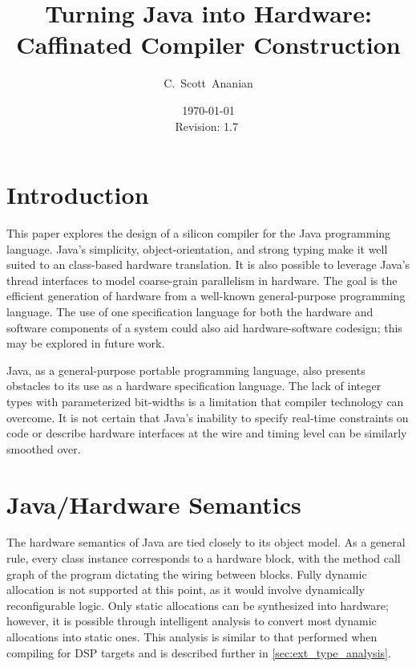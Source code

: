 \documentclass[11pt,notitlepage,twocolumn]{article}
\author{C.~Scott~Ananian}
\title{Turning Java into Hardware: \\ Caffinated Compiler Construction}
\date{\today \\ $ $Revision: 1.7 $ $}
\begin{document}

\maketitle

\section{Introduction}
This paper explores the design of a silicon compiler for the Java
programming language.  Java's simplicity, object-orientation, and
strong typing make it well suited to an class-based hardware
translation.  It is also possible to leverage Java's thread interfaces
to model coarse-grain parallelism in hardware.  The goal is the
efficient generation of hardware from a well-known general-purpose
programming language.  The use of one specification language for both
the hardware and software components of a system could also aid
hardware-software codesign; this may be explored in future work.

Java, as a general-purpose portable programming language, also
presents obstacles to its use as a hardware specification language.
The lack of integer types with parameterized bit-widths is a
limitation that compiler technology can overcome.  It is not certain
that Java's inability to specify real-time constraints on code or
describe hardware interfaces at the wire and timing level can be
similarly smoothed over.

\section{Java/Hardware Semantics}
The hardware semantics of Java are tied closely to its object model.
As a general rule, every class instance corresponds to a hardware
block, with the method call graph of the program dictating the wiring
between blocks.  Fully dynamic allocation is not supported at this
point, as it would involve dynamically reconfigurable logic.  Only
static allocations can be synthesized into hardware; however, it is
possible through intelligent analysis to convert most dynamic
allocations into static ones.  This analysis is similar to that
performed when compiling for DSP targets \cite{DSP_targets} and is
described further in \ref{sec:ext_type_analysis}.
\end{document}
